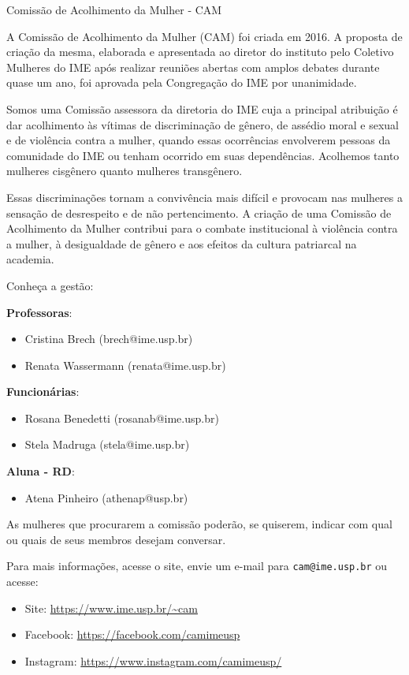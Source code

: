 \begin{subsecao}{Comissão de Acolhimento da Mulher - CAM}

A Comissão de Acolhimento da Mulher (CAM) foi criada em 2016. A proposta de 
criação da mesma, elaborada e apresentada ao diretor do instituto pelo 
Coletivo Mulheres do IME após realizar reuniões abertas com amplos debates 
durante quase um ano, foi aprovada pela Congregação do IME por unanimidade.

Somos uma Comissão assessora da diretoria do IME cuja a principal atribuição 
é dar acolhimento às vítimas de discriminação de gênero, de assédio moral e 
sexual e de violência contra a mulher, quando essas ocorrências envolverem 
pessoas da comunidade do IME ou tenham ocorrido em suas dependências. Acolhemos
tanto mulheres cisgênero quanto mulheres transgênero.

Essas discriminações tornam a convivência mais difícil e provocam nas mulheres
a sensação de desrespeito e de não pertencimento. A criação de uma Comissão de 
Acolhimento da Mulher contribui para o combate institucional à violência contra
a mulher, à desigualdade de gênero e aos efeitos da cultura patriarcal na academia.

Conheça a gestão: 

\textbf{Professoras}: 
\vspace{-15pt}
\begin{itemize}
  \item Cristina Brech (brech@ime.usp.br)
  \item Renata Wassermann (renata@ime.usp.br)
\end{itemize}

\textbf{Funcionárias}: 
\vspace{-15pt}
\begin{itemize}
  \item Rosana Benedetti (rosanab@ime.usp.br)
  \item Stela Madruga (stela@ime.usp.br)
\end{itemize}

\textbf{Aluna - RD}: 
\vspace{-15pt}
\begin{itemize}
  \item Atena Pinheiro (athenap@usp.br)
\end{itemize}

As mulheres que procurarem a comissão poderão, se quiserem, indicar com qual ou 
quais de seus membros desejam conversar.

Para mais informações, acesse o site, envie um e-mail para {\tt cam@ime.usp.br} ou acesse:
\begin{itemize}
  \item Site: \url{https://www.ime.usp.br/~cam}
  \item Facebook: \url{https://facebook.com/camimeusp}
  \item Instagram: \url{https://www.instagram.com/camimeusp/}
\end{itemize}


\end{subsecao}
